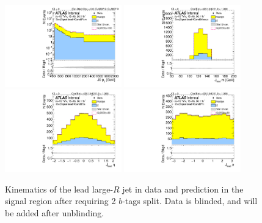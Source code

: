 \clearpage

\begin{figure}[htbp!]
\begin{center}
\includegraphics[angle=270, width=0.45\textwidth]{./figures/boosted/Signal/b77_TwoTag_split_Signal_leadHCand_Pt_m_1_blind.pdf}
\includegraphics[angle=270, width=0.45\textwidth]{./figures/boosted/Signal/b77_TwoTag_split_Signal_leadHCand_Mass_s_blind.pdf}\\
\includegraphics[angle=270, width=0.45\textwidth]{./figures/boosted/Signal/b77_TwoTag_split_Signal_leadHCand_Eta_blind.pdf}
\includegraphics[angle=270, width=0.45\textwidth]{./figures/boosted/Signal/b77_TwoTag_split_Signal_leadHCand_Phi_blind.pdf}
  \caption{Kinematics of the lead large-$R$ jet in data and prediction in the signal region after requiring 2 $b$-tags split. Data is blinded, and will be added after unblinding.}
  \label{fig:boosted-2bs-signal-blind-ak10-lead}
\end{center}
\end{figure}

